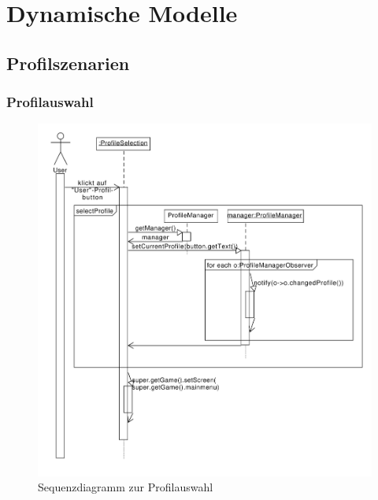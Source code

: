 \section{Dynamische Modelle}

\subsection{Profilszenarien}

\subsubsection{Profilauswahl}
\begin{figure}[H]
\centering
\includegraphics[scale=0.65]{./sections/sequence_diagrams/profile_scenarios/Profilauswahl.pdf}
\caption{Sequenzdiagramm zur Profilauswahl}
\end{figure}

